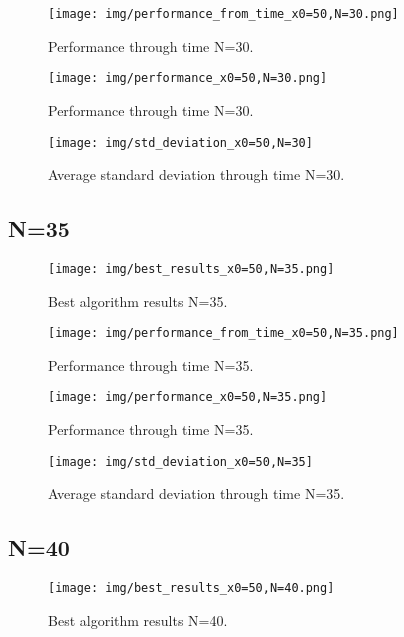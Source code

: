\documentclass{article}
\begin{document}
\begin{figure}[H]
\centering
\texttt{[image: img/performance\_from\_time\_x0=50,N=30.png]}
\caption{Performance through time N=30.}
\label{fig:label1}
\end{figure}

\begin{figure}[H]
\centering
\texttt{[image: img/performance\_x0=50,N=30.png]}
\caption{Performance through time N=30.}
\label{fig:label1}
\end{figure}

\begin{figure}[H]
\centering
\texttt{[image: img/std\_deviation\_x0=50,N=30]}
\caption{Average standard deviation through time N=30.}
\label{fig:label1}
\end{figure}


\subsection{N=35}
\begin{figure}[H]
\centering
\texttt{[image: img/best\_results\_x0=50,N=35.png]}
\caption{Best algorithm results N=35.}
\label{fig:label1}
\end{figure}

\begin{figure}[H]
\centering
\texttt{[image: img/performance\_from\_time\_x0=50,N=35.png]}
\caption{Performance through time N=35.}
\label{fig:label1}
\end{figure}

\begin{figure}[H]
\centering
\texttt{[image: img/performance\_x0=50,N=35.png]}
\caption{Performance through time N=35.}
\label{fig:label1}
\end{figure}

\begin{figure}[H]
\centering
\texttt{[image: img/std\_deviation\_x0=50,N=35]}
\caption{Average standard deviation through time N=35.}
\label{fig:label1}
\end{figure}

\subsection{N=40}
\begin{figure}[H]
\centering
\texttt{[image: img/best\_results\_x0=50,N=40.png]}
\caption{Best algorithm results N=40.}
\label{fig:label1}
\end{figure}
\end{document}
